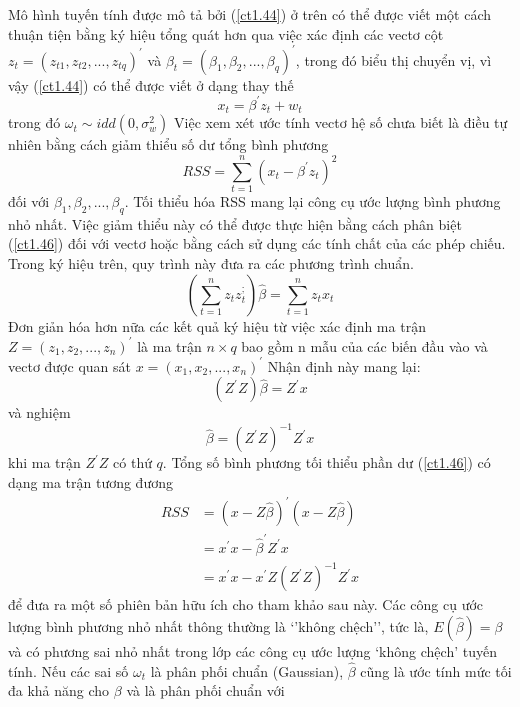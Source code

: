 \documentclass[12pt, a4paper,oneside]{book}
\theoremstyle{definition}
\begin{document}
Mô hình tuyến tính được mô tả bởi (\ref{ct1.44}) ở trên có thể được viết một cách thuận tiện bằng ký hiệu tổng quát hơn qua việc xác định các vectơ cột $z_{t}=(z_{t1},z_{t2},...,z_{tq})^{'}$ và $\beta_{t}=(\beta_{1},\beta_{2},...,\beta_{q})^{'}$, trong đó biểu thị chuyển vị, vì vậy (\ref{ct1.44}) có thể được viết ở dạng thay thế
\begin{equation}
x_{t}=\beta^{'} z_{t} + w_{t} \label{ct1.45}
\end{equation}	
trong đó $\omega_{t} \sim idd(0,\sigma_{w}^{2})$ Việc xem xét ước tính vectơ hệ số chưa biết là điều tự nhiên bằng cách giảm thiểu số dư tổng bình phương
\begin{equation}
RSS = \sum_{t=1}^{n} (x_{t}- \beta ^{'}z_{t})^{2} \label{ct1.46}	
\end{equation}
đối với $\beta_{1},\beta_{2},...,\beta_{q}$. Tối thiểu hóa RSS mang lại công cụ ước lượng bình phương nhỏ nhất. Việc giảm thiểu này có thể được thực hiện bằng cách phân biệt (\ref{ct1.46}) đối với vectơ hoặc bằng cách sử dụng các tính chất của các phép chiếu. Trong ký hiệu trên, quy trình này đưa ra các phương trình chuẩn.
\begin{equation}
(\sum_{t=1}^{n} z_{t}z_{t}^{;})\hat{\beta}= \sum_{t=1}^{n} z_{t} x_{t} \label{ct1.47}
\end{equation}
Đơn giản hóa hơn nữa các kết quả ký hiệu từ việc xác định ma trận 
$Z=(z_{1},z_{2},...,z_{n})^{'}$ là ma trận $n\times q$ bao gồm n mẫu của các biến đầu vào và vectơ được quan sát $x=(x_{1},x_{2},...,x_{n})^{'}$ Nhận định này mang lại:
\begin{equation}
	(Z^{'}Z)\hat{\beta}=Z^{'}x \label{ct1.48}
\end{equation}
và nghiệm
\begin{equation}
\hat{\beta}=(Z^{'}Z)^{-1}Z^{'}x \label{ct1.49}	
\end{equation}
khi ma trận $ Z^{'}Z $ có thứ $ q $. Tổng số bình phương tối thiểu phần dư  (\ref{ct1.46}) có dạng ma trận tương đương
\begin{align*}
RSS&=(x-Z\hat{\beta})^{'}(x-Z\hat{\beta})\\
&=x^{'}x-\hat{\beta}^{'}Z^{'}x\\
&=x^{'}x-x^{'}Z(Z^{'}Z)^{-1}Z^{'}x
\end{align*}
để đưa ra một số phiên bản hữu ích cho tham khảo sau này. Các công cụ ước lượng bình phương nhỏ nhất thông thường là ‘’không chệch’’, tức là, $E(\hat{\beta})=\beta$ và có phương sai nhỏ nhất trong lớp các công cụ ước lượng ‘không chệch’ tuyến tính. Nếu các sai số $ \omega_{t} $ là phân phối chuẩn (Gaussian), $ \hat{\beta}$ cũng là ước tính mức tối đa khả năng cho $\beta$ và là phân phối chuẩn với 
\end{document}
